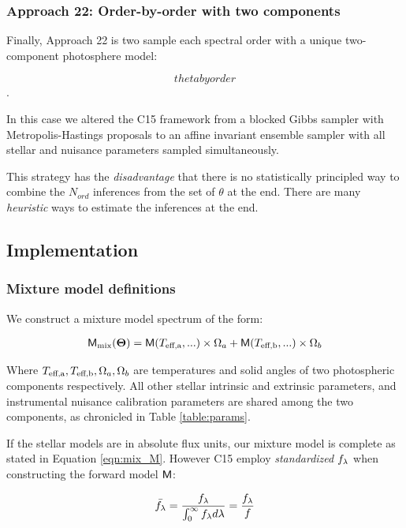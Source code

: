 \documentclass[onecolumn]{emulateapj}%
\newcommand{\iancze}{{\sc C15 }}
\begin{document}
\subsubsection{Approach 22: Order-by-order with two components}

Finally, Approach 22 is two sample each spectral order with a unique two-component photosphere model: 

$$ theta by order$$. 

In this case we altered the \iancze framework from a blocked Gibbs sampler with Metropolis-Hastings proposals to an affine invariant ensemble sampler with all stellar and nuisance parameters sampled simultaneously.  

This strategy has the \emph{disadvantage} that there is no statistically principled way to combine the $N_{ord}$ inferences from the set of $\theta$ at the end.  There are many \emph{heuristic} ways to estimate the inferences at the end.  


\subsection{Implementation}

\subsubsection{Mixture model definitions}

We construct a mixture model spectrum of the form:

\begin{eqnarray} \label{eqn:mix_M}
\mathsf{M}_{\mathrm{mix}}({\bm \Theta}) = \mathsf{M}(T_\textrm{eff,a}, ...) \times \Omega_a + \mathsf{M}(T_\textrm{eff,b}, ...) \times \Omega_b
\end{eqnarray}


Where $T_\textrm{eff,a}, T_\textrm{eff,b}, \Omega_a, \Omega_b$ are temperatures and solid angles of two photospheric components respectively.  All other stellar intrinsic and extrinsic parameters, and instrumental nuisance calibration parameters are shared among the two components, as chronicled in Table \ref{table:params}.

If the stellar models are in absolute flux units, our mixture model is complete as stated in Equation \ref{eqn:mix_M}.  However \iancze employ \emph{standardized} $f_\lambda$ when constructing the forward model $\mathsf{M}$:


\begin{eqnarray} \label{eqn:normalization}
\bar {f_\lambda} = \frac{f_\lambda}{\int_{0}^{\infty} f_\lambda d\lambda} = \frac{f_\lambda}{f}
\end{eqnarray}
\end{document}
